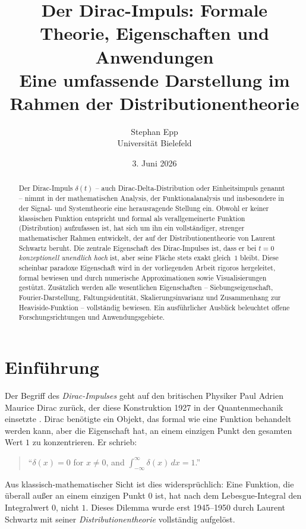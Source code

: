 ﻿\documentclass[a4paper,12pt]{article}
\title{Der Dirac-Impuls: Formale Theorie, Eigenschaften und Anwendungen\\[0.5em]
\large Eine umfassende Darstellung im Rahmen der Distributionentheorie}
\author{Stephan Epp\\
Universit\"at Bielefeld}
\date{3. Juni 2026}
\theoremstyle{definition}
\begin{document}
\maketitle

\begin{abstract}
Der Dirac-Impuls $\delta(t)$ -- auch Dirac-Delta-Distribution oder Einheitsimpuls genannt -- nimmt
in der mathematischen Analysis, der Funktionalanalysis und insbesondere in der Signal- und
Systemtheorie eine herausragende Stellung ein. Obwohl er keiner klassischen Funktion entspricht
und formal als verallgemeinerte Funktion (Distribution) aufzufassen ist, hat sich um ihn ein
vollst\"andiger, strenger mathematischer Rahmen entwickelt, der auf der Distributionentheorie von
Laurent Schwartz beruht. Die zentrale Eigenschaft des Dirac-Impulses ist, dass er bei $t=0$
\emph{konzeptionell unendlich hoch} ist, aber seine Fl\"ache stets exakt gleich~$1$ bleibt.
Diese scheinbar paradoxe Eigenschaft wird in der vorliegenden Arbeit rigoros hergeleitet, formal
bewiesen und durch numerische Approximationen sowie Visualisierungen gest\"utzt. Zus\"atzlich
werden alle wesentlichen Eigenschaften -- Siebungseigenschaft, Fourier-Darstellung, Faltungsidentit\"at,
Skalierungsinvarianz und Zusammenhang zur Heaviside-Funktion -- vollst\"andig bewiesen. Ein
ausf\"uhrlicher Ausblick beleuchtet offene Forschungsrichtungen und Anwendungsgebiete.
\end{abstract}

\tableofcontents
\newpage

\section{Einf\"uhrung}

Der Begriff des \emph{Dirac-Impulses} geht auf den britischen Physiker Paul Adrien Maurice Dirac
zur\"uck, der diese Konstruktion 1927 in der Quantenmechanik einsetzte \cite{dirac1927}. Dirac
ben\"otigte ein Objekt, das formal wie eine Funktion behandelt werden kann, aber die Eigenschaft
hat, an einem einzigen Punkt den gesamten Wert $1$ zu konzentrieren. Er schrieb:
\begin{quote}
``$\delta(x) = 0$ for $x \neq 0$, and $\int_{-\infty}^{\infty} \delta(x)\,dx = 1$.''
\end{quote}
Aus klassisch-mathematischer Sicht ist dies widerspr\"uchlich: Eine Funktion, die \"uberall
au{\ss}er an einem einzigen Punkt $0$ ist, hat nach dem Lebesgue-Integral den Integralwert $0$,
nicht $1$. Dieses Dilemma wurde erst 1945--1950 durch Laurent Schwartz mit seiner
\emph{Distributionentheorie} \cite{schwartz1950} vollst\"andig aufgel\"ost.
\end{document}
